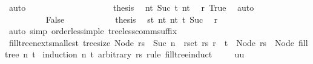 \begin{isabellebody}
\ auto\isanewline
\ \ \ \ \ \ \ \ \isamarkupfalse%
\isanewline
\ \ \ \ \ \ \ \ \isamarkupfalse%
\ \isamarkupfalse%
\ {\isacharquery}{\kern0pt}thesis\ \isamarkupfalse%
\ nt{}\ Suc\ t{}\ nt{}\ \isamarkupfalse%
\ r\ True\ \isamarkupfalse%
\ auto\isanewline
\ \ \ \ \ \ \isamarkupfalse%
\isanewline
\ \ \ \ \ \ \ \ \isamarkupfalse%
\ False\isanewline
\ \ \ \ \ \ \ \ \isamarkupfalse%
\ \isamarkupfalse%
\ {\isacharquery}{\kern0pt}thesis\ \isamarkupfalse%
\ {\isacartoucheopen}s{\isasymle}t{}{\isacartoucheclose}\ nt{}\ nt{}\ t{}\ Suc\ \isamarkupfalse%
\ r\isanewline
\ \ \ \ \ \ \ \ \ \ \isamarkupfalse%
\ {\isacharparenleft}{\kern0pt}auto\ simp{\isacharcolon}{\kern0pt}\ order{\isacharunderscore}{\kern0pt}less{\isacharunderscore}{\kern0pt}imp{\isacharunderscore}{\kern0pt}le\ tree{\isacharunderscore}{\kern0pt}less{\isacharunderscore}{\kern0pt}comm{\isacharunderscore}{\kern0pt}suffix{}{\isacharparenright}{\kern0pt}\isanewline
\ \ \ \ \ \ \isamarkupfalse%
\isanewline
\ \ \ \ \isamarkupfalse%
\isanewline
\ \ \isamarkupfalse%
\isanewline
{}\isamarkupfalse%
%
\endisatagproof
{\isafoldproof}%
%
\isadelimproof
\isanewline
%
\endisadelimproof
\isanewline
{}\isamarkupfalse%
\ fill{\isacharunderscore}{\kern0pt}tree{\isacharunderscore}{\kern0pt}next{\isacharunderscore}{\kern0pt}smallest{\isacharcolon}{\kern0pt}\ {\isachardoublequoteopen}tree{\isacharunderscore}{\kern0pt}size\ {\isacharparenleft}{\kern0pt}Node\ rs{\isacharparenright}{\kern0pt}\ {\isasymle}\ Suc\ n\ {\isasymLongrightarrow}\ {\isasymforall}r{\isasymin}set\ rs{\isachardot}{\kern0pt}\ r\ {\isasymle}\ t\ {\isasymLongrightarrow}\ Node\ rs\ {\isasymle}\ Node\ {\isacharparenleft}{\kern0pt}fill{\isacharunderscore}{\kern0pt}tree\ n\ t{\isacharparenright}{\kern0pt}{\isachardoublequoteclose}\isanewline
%
\isadelimproof
%
\endisadelimproof
%
\isatagproof
{}\isamarkupfalse%
\ {\isacharparenleft}{\kern0pt}induction\ n\ t\ arbitrary{\isacharcolon}{\kern0pt}\ rs\ rule{\isacharcolon}{\kern0pt}\ fill{\isacharunderscore}{\kern0pt}tree{\isachardot}{\kern0pt}induct{\isacharparenright}{\kern0pt}\isanewline
\ \ \isamarkupfalse%
\ {\isacharparenleft}{\kern0pt}{}\ uu{\isacharparenright}{\kern0pt}\isanewline

\end{isabellebody}

